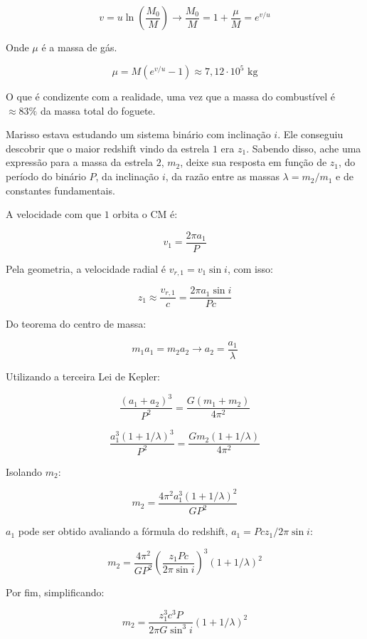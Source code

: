 \documentclass[11pt]{article}
\begin{document}
\begin{pproblem}
\begin{pssolution*}{}{}
\begin{alternativas}
            \[v = u\ln\left(\frac{M_0}{M}\right) \rightarrow \frac{M_0}{M}  = 1+ \frac{\mu}{M}= e^{v/u}\]

            Onde \(\mu\) é a massa de gás.

            \[\boxed{\mu = M(e^{v/u}-1) \approx 7,12 \cdot 10^5 \text{ kg}}\]

            O que é condizente com a realidade, uma vez que a massa do combustível é \(\approx 83\%\) da massa total do foguete.
        \end{alternativas}
    \end{pssolution*}
\end{pproblem}

\begin{pproblem} Marisso estava estudando um sistema binário com inclinação \(i\). Ele conseguiu descobrir que o maior redshift vindo da estrela \(1\) era \(z_1\). Sabendo disso, ache uma expressão para a massa da estrela \(2\), \(m_2\), deixe sua resposta em função de \(z_1\), do período do binário \(P\), da inclinação \(i\), da razão entre as massas \(\lambda  = m_2/m_1\) e de constantes fundamentais.
    \begin{pssolution*}{}{}
        A velocidade com que \(1\) orbita o CM é:

        \[v_1 = \frac{2\pi a_1}{P}\]

        Pela geometria, a velocidade radial é \(v_{r,1}=v_1\sin i\), com isso:

        \[z_1 \approx \frac{v_{r,1}}{c} = \frac{2\pi a_1\sin i}{Pc}\]

        Do teorema do centro de massa:

        \[m_1a_1=m_2a_2 \rightarrow a_2 = \frac{a_1}{\lambda}\]

        Utilizando a terceira Lei de Kepler:

        \[\frac{(a_1+a_2)^3}{P^2} = \frac{G(m_1+m_2)}{4\pi^2}\]

        \[\frac{a_1^3(1+1/\lambda)^3}{P^2} = \frac{Gm_2(1+1/\lambda)}{4\pi^2}\]

        Isolando \(m_2\):

        \[m_2 = \frac{4\pi^2a_1^3(1+1/\lambda)^2}{GP^2}\]

        \(a_1\) pode ser obtido avaliando a fórmula do redshift, \(a_1 = Pcz_1/2\pi\sin i\):

        \[m_2 = \frac{4\pi^2}{GP^2}\left(\frac{z_1Pc}{2\pi\sin i}\right)^3(1+1/\lambda)^2\]

        Por fim, simplificando:

        \[\boxed{m_2 = \frac{z_1^3c^3P}{2\pi G \sin^3i}(1+1/\lambda)^2}\]
    \end{pssolution*}
\end{pproblem}
\end{document}
